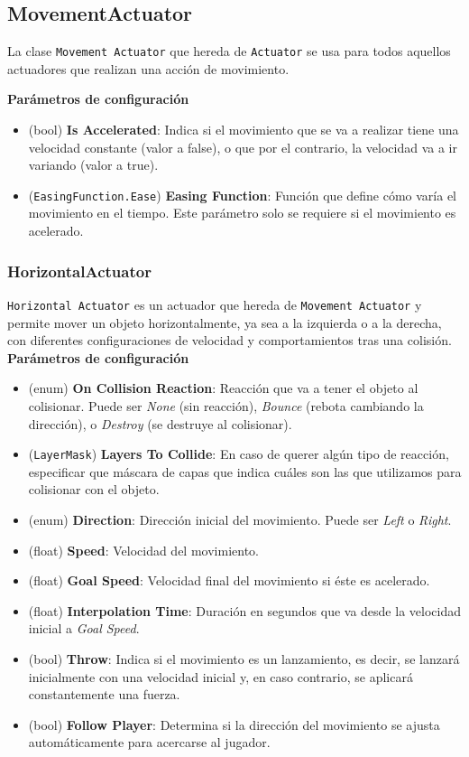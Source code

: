 \subsection{MovementActuator}
La clase \texttt{Movement Actuator} que hereda de \texttt{Actuator} se usa para todos aquellos actuadores que realizan una acción de movimiento.

\textbf{Parámetros de configuración}
\begin{itemize}
	\item (bool) \textbf{Is Accelerated}: Indica si el movimiento que se va a realizar tiene una velocidad constante (valor a false), o que por el contrario, la velocidad va a ir variando (valor a true).
	\item (\texttt{EasingFunction.Ease}) \textbf{Easing Function}: Función que define cómo varía el movimiento en el tiempo. Este parámetro solo se requiere si el movimiento es acelerado.
\end{itemize}

\subsubsection{HorizontalActuator}
\texttt{Horizontal Actuator} es un actuador que hereda de \texttt{Movement Actuator} y permite mover un objeto horizontalmente, ya sea a la izquierda o a la derecha, con diferentes configuraciones de velocidad y comportamientos tras una colisión.\\

\textbf{Parámetros de configuración}
\begin{itemize}
	\item (enum) \textbf{On Collision Reaction}: Reacción que va a tener el objeto al colisionar. Puede ser \textit{None} (sin reacción), \textit{Bounce} (rebota cambiando la dirección), o \textit{Destroy} (se destruye al colisionar).
	\item (\texttt{LayerMask}) \textbf{Layers To Collide}: En caso de querer algún tipo de reacción, especificar que máscara de capas que indica cuáles son las que utilizamos para colisionar con el objeto.
	\item (enum) \textbf{Direction}: Dirección inicial del movimiento. Puede ser \textit{Left} o \textit{Right}.
	\item (float) \textbf{Speed}: Velocidad del movimiento.
	\item (float) \textbf{Goal Speed}: Velocidad final del movimiento si éste es acelerado.
	\item (float) \textbf{Interpolation Time}: Duración en segundos que va desde la velocidad inicial a \textit{Goal Speed}.
	\item (bool) \textbf{Throw}: Indica si el movimiento es un lanzamiento, es decir, se lanzará inicialmente con una velocidad inicial y, en caso contrario, se aplicará constantemente una fuerza.
	\item (bool) \textbf{Follow Player}: Determina si la dirección del movimiento se ajusta automáticamente para acercarse al jugador.
\end{itemize}

